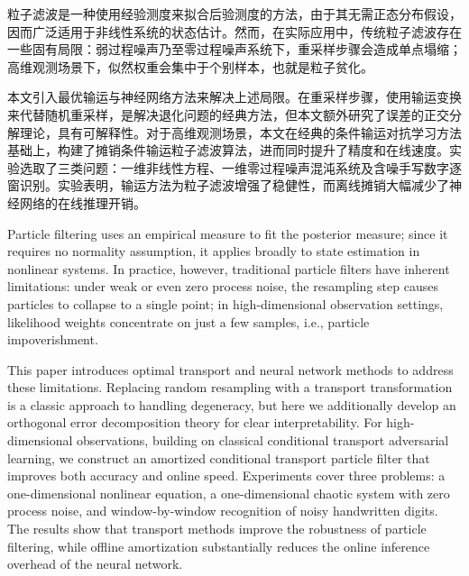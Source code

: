 \begin{cabstract}
粒子滤波是一种使用经验测度来拟合后验测度的方法，由于其无需正态分布假设，因而广泛适用于非线性系统的状态估计。然而，在实际应用中，传统粒子滤波存在一些固有局限：弱过程噪声乃至零过程噪声系统下，重采样步骤会造成单点塌缩；高维观测场景下，似然权重会集中于个别样本，也就是粒子贫化。

本文引入最优输运与神经网络方法来解决上述局限。在重采样步骤，使用输运变换来代替随机重采样，是解决退化问题的经典方法，但本文额外研究了误差的正交分解理论，具有可解释性。对于高维观测场景，本文在经典的条件输运对抗学习方法基础上，构建了摊销条件输运粒子滤波算法，进而同时提升了精度和在线速度。实验选取了三类问题：一维非线性方程、一维零过程噪声混沌系统及含噪手写数字逐窗识别。实验表明，输运方法为粒子滤波增强了稳健性，而离线摊销大幅减少了神经网络的在线推理开销。
\end{cabstract}
\begin{eabstract}
Particle filtering uses an empirical measure to fit the posterior measure; since it requires no normality assumption, it applies broadly to state estimation in nonlinear systems. In practice, however, traditional particle filters have inherent limitations: under weak or even zero process noise, the resampling step causes particles to collapse to a single point; in high-dimensional observation settings, likelihood weights concentrate on just a few samples, i.e., particle impoverishment.

This paper introduces optimal transport and neural network methods to address these limitations. Replacing random resampling with a transport transformation is a classic approach to handling degeneracy, but here we additionally develop an orthogonal error decomposition theory for clear interpretability. For high-dimensional observations, building on classical conditional transport adversarial learning, we construct an amortized conditional transport particle filter that improves both accuracy and online speed. Experiments cover three problems: a one-dimensional nonlinear equation, a one-dimensional chaotic system with zero process noise, and window-by-window recognition of noisy handwritten digits. The results show that transport methods improve the robustness of particle filtering, while offline amortization substantially reduces the online inference overhead of the neural network.
\end{eabstract}
